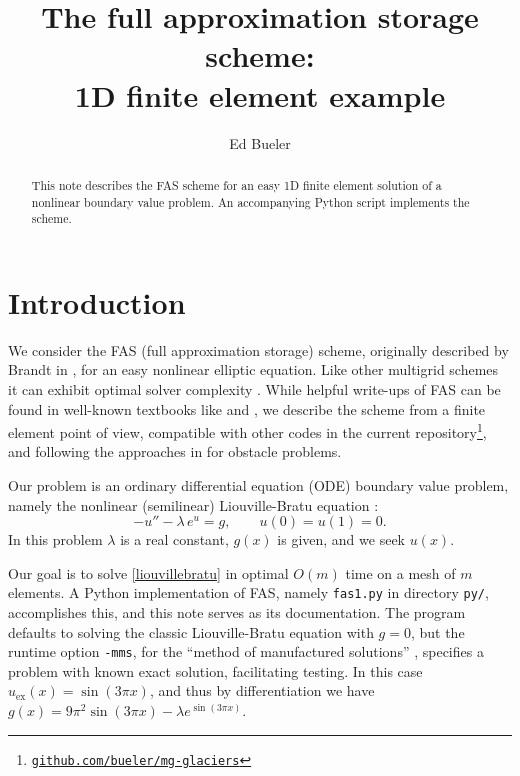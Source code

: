\documentclass[letterpaper,final,12pt,reqno]{amsart}
\begin{document}
\title[Full approximation storage]{The full approximation storage scheme: \\ 1D finite element example}

\author{Ed Bueler}

\begin{abstract}  This note describes the FAS scheme for an easy 1D finite element solution of a nonlinear boundary value problem.  An accompanying Python script implements the scheme.
\end{abstract}

\maketitle

\thispagestyle{empty}
\bigskip

\section{Introduction}

We consider the FAS (full approximation storage) scheme, originally described by Brandt in \cite{Brandt1977}, for an easy nonlinear elliptic equation.  Like other multigrid schemes it can exhibit optimal solver complexity \cite{Bueler2021}.  While helpful write-ups of FAS can be found in well-known textbooks like \cite[Chapter 6]{Briggsetal2000} and \cite{Trottenbergetal2001}, we describe the scheme from a finite element point of view, compatible with other codes in the current repository\footnote{\href{https://github.com/bueler/mg-glaciers}{\texttt{github.com/bueler/mg-glaciers}}}, and following the approaches in \cite{GraeserKornhuber2009} for obstacle problems.

Our problem is an ordinary differential equation (ODE) boundary value problem, namely the nonlinear (semilinear) Liouville-Bratu equation \cite{Bratu1914,Liouville1853}:
\begin{equation}
  -u'' - \lambda\, e^u = g,  \qquad u(0) = u(1) = 0.  \label{liouvillebratu}
\end{equation}
In this problem $\lambda$ is a real constant, $g(x)$ is given, and we seek $u(x)$.

Our goal is to solve \eqref{liouvillebratu} in optimal $O(m)$ time on a mesh of $m$ elements.  A Python implementation of FAS, namely \texttt{fas1.py} in directory \texttt{py/}, accomplishes this, and this note serves as its documentation.  The program defaults to solving the classic Liouville-Bratu equation with $g=0$, but the runtime option \texttt{-mms}, for the ``method of manufactured solutions'' \cite{Bueler2021}, specifies a problem with known exact solution, facilitating testing.  In this case $u_{\text{ex}}(x)=\sin(3\pi x)$, and thus by differentiation we have $g(x)=9\pi^2 \sin(3\pi x) - \lambda e^{\sin(3\pi x)}$.
\end{document}
